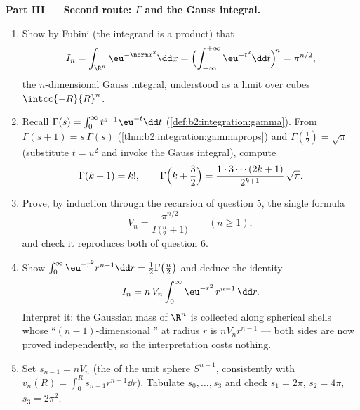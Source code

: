 \begin{problem}[{Weekend problem --- $V_n =
\pi^{n/2}/\Gamma(\frac n2 + 1)$, and the strangeness of high
dimensions}]
\medskip
\noindent\textbf{Part III --- Second route: $\Gamma$ and the
Gauss integral.}
\begin{enumerate}[resume]
  \item Show by Fubini (the integrand is a product) that
        \[
        I_n = \int_{\R^n}\eu^{-\norm
        x^2}\dd x
        = \Bigl(\int_{-\infty}^{+\infty}
        \eu^{-t^2}\dd t\Bigr)^{\!n} = \pi^{n/2},
        \]
        the $n$-dimensional Gauss integral, understood as a
        limit over cubes $\intcc{-R}{R}^n$.
  \item Recall $\Gamma(s) = \int_0^\infty t^{s-1}\eu^{-t}\dd
        t$ (\cref{def:b2:integration:gamma}). From
        $\Gamma(s+1) = s\,\Gamma(s)$
        (\cref{thm:b2:integration:gammaprops}) and
        $\Gamma(\tfrac12) = \sqrt\pi$ (substitute $t = u^2$
        and invoke the Gauss integral), compute
        \[
        \Gamma(k + 1) = k!,
        \qquad
        \Gamma\Bigl(k + \frac32\Bigr) =
        \frac{1\cdot3\cdots(2k+1)}{2^{k+1}}\,\sqrt\pi .
        \]
  \item Prove, by induction through the recursion of question
        5, the single formula
        \[
        V_n = \frac{\pi^{n/2}}{\Gamma\bigl(\frac n2 +
        1\bigr)} \qquad (n \geq 1),
        \]
        and check it reproduces both  of question
        6.
  \item Show $\int_0^\infty \eu^{-r^2}r^{n-1}\dd r =
        \tfrac12\Gamma\bigl(\tfrac n2\bigr)$ and deduce the
        identity
        \[
        I_n = n\,V_n\int_0^\infty \eu^{-r^2}\,r^{n-1}\,\dd r.
        \]
        Interpret it: the Gaussian mass of $\R^n$ is
        collected along spherical shells whose
        ``$(n-1)$-dimensional '' at radius $r$ is
        $nV_nr^{n-1}$ --- both sides are now proved
        independently, so the interpretation costs nothing.
  \item Set $s_{n-1} = nV_n$ (the  of the unit sphere
        $S^{n-1}$, consistently with $v_n(R) = \int_0^R
        s_{n-1}r^{n-1}\dd r$). Tabulate $s_0, \dots, s_3$ and
        check $s_1 = 2\pi$, $s_2 = 4\pi$, $s_3 = 2\pi^2$.
\end{enumerate}


\end{problem}
